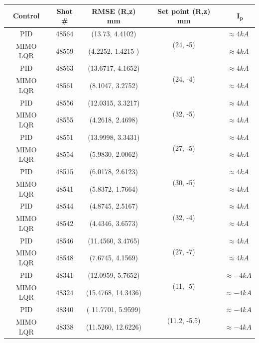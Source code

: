 \clearpage
\begin{center}
	\begin{longtable}{||c| c| c| c|c||} 
		\hline
		\rowcolor{color2}
		\textbf{Control} &  \textbf{Shot \#} &\textbf{RMSE (R,z) mm} & \textbf{ Set point (R,z) mm} &\ $\mathbf{I_p}$ \\ [0.5ex] 
		\hline\hline
		PID & 48564 &  (13.73, 4.4102) & \multirow{ 2}{*}{(24, -5)}&  $\approx 4 kA$ \\ 
		\cline{1-3} \cline{5-5}
		MIMO LQR & 48559 & (4.2252, 1.4215 ) & &  $\approx 4 kA$	\\
		\hline
		PID & 48563 & (13.6717,	4.1652)  & \multirow{ 2}{*}{(24, -4)}& $\approx 4 kA$ \\ 
		\cline{1-3} \cline{5-5}
		MIMO LQR & 48561 & (8.1047,	3.2752) & & $\approx 4 kA$ \\
		\hline
		PID & 48556 & (12.0315,	3.3217)  & \multirow{ 2}{*}{(32, -5)}& $\approx 4 kA$  \\ 
		\cline{1-3} \cline{5-5}
		MIMO LQR & 48555 & (4.2618, 2.4698) &  &  $\approx 4 kA$ \\
		\hline
		PID & 48551 & (13.9998,	3.3431)  & \multirow{ 2}{*}{(27, -5)} &  $\approx 4 kA$ \\ 
		\cline{1-3} \cline{5-5}
		MIMO LQR & 48554 & (5.9830, 2.0062)  &  &  $\approx 4 kA$ \\
		\hline
		PID & 48515 & (6.0178,	2.6123)  & \multirow{ 2}{*}{(30, -5)} & $\approx 4 kA$ \\ 
		\cline{1-3} \cline{5-5}
		MIMO LQR & 48541 & (5.8372,	1.7664) &  &  $\approx 4 kA$\\
		\hline
		PID & 48544 & (4.8745,	2.5167)  & \multirow{ 2}{*}{(32, -4)}& $\approx 4 kA$ \\ 
		\cline{1-3} \cline{5-5}
		MIMO LQR & 48542 & (4.4346,	3.6573) & &  $\approx 4 kA$ \\
		\hline
		PID & 48546 & (11.4560, 3.4765)  & \multirow{ 2}{*}{(27, -7)}&   $\approx 4 kA$\\ 
		\cline{1-3} \cline{5-5}
		MIMO LQR & 48548 & (7.6745, 4.1569) & &  $\approx 4 kA$ \\
		\hline
		PID & 48341 & (12.0959,	5.7652)  & \multirow{ 2}{*}{(11, -5)}& $\approx -4 kA$\\ 
		\cline{1-3} \cline{5-5}
		MIMO LQR & 48324 &  (15.4768,	14.3436)& & $\approx -4 kA$ \\
		\hline
		PID & 48340 & ( 11.7701, 5.9599) & \multirow{ 2}{*}{(11.2, -5.5)}&  $\approx -4 kA$\\ 
		\cline{1-3} \cline{5-5}
		MIMO LQR & 48338 & (11.5260,	12.6226) &  &  $\approx -4 kA$\\

\end{longtable}
\end{center}

